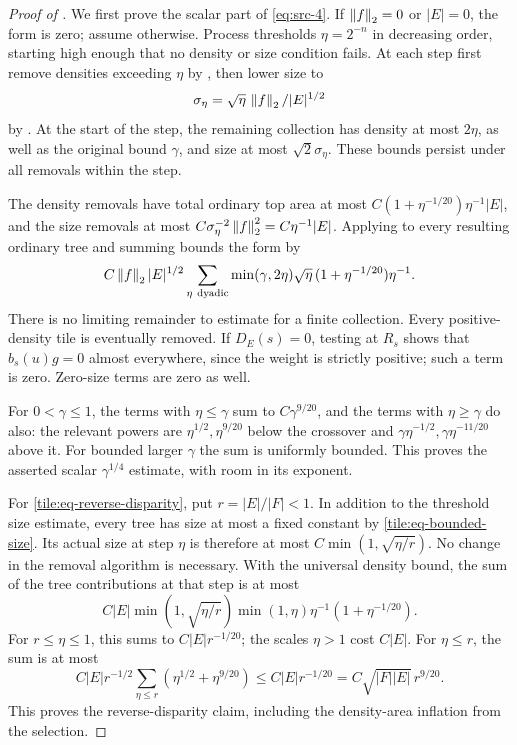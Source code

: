 \begin{proof}[Proof of ]
We first prove the scalar part of
\eqref{eq:src-4}.  If \(\left\|f\right\|_2=0\)
or \(|E|=0\), the form is zero; assume
otherwise.  Process thresholds
\(\eta=2^{-n}\) in decreasing order,
starting high enough that no density
or size condition fails.  At each
step first remove densities exceeding
\(\eta\) by ,
then lower size to
\[
 \sigma_\eta=\sqrt\eta\,
                    \left\|f\right\|_2/|E|^{1/2}
\]
by .  At the
start of the step, the remaining
collection has density at most
\(2\eta\), as well as the original
bound \(\gamma\), and size at most
\(\sqrt2\sigma_\eta\).  These
bounds persist under all removals
within the step.

The density removals have total
ordinary top area at most
\(C(1+\eta^{-1/20})\eta^{-1}|E|\),
and the size removals at most
\(C\sigma_\eta^{-2}\left\|f\right\|_2^2
 =C\eta^{-1}|E|\).
Applying  to
every resulting ordinary tree and
summing bounds the form by
\begin{equation}\label{tile:eq-threshold-sum}
 C\left\|f\right\|_2|E|^{1/2}
 \sum_{\eta\ \text{dyadic}}
       \min(\gamma,2\eta)\sqrt\eta\,
             (1+\eta^{-1/20})\eta^{-1}.
\end{equation}
There is no limiting remainder to
estimate for a finite collection.
Every positive-density tile is
eventually removed.  If \(D_E(s)=0\),
testing at \(R_s\) shows that
\(b_s(u)g=0\) almost everywhere,
since the weight is strictly positive;
such a term is zero.  Zero-size
terms are zero as well.

For \(0<\gamma\leq1\), the terms
with \(\eta\leq\gamma\) sum to
\(C\gamma^{9/20}\), and the terms
with \(\eta\geq\gamma\) do also:
the relevant powers are
\(\eta^{1/2},\eta^{9/20}\) below
the crossover and
\(\gamma\eta^{-1/2},
  \gamma\eta^{-11/20}\) above it.
For bounded larger \(\gamma\) the
sum is uniformly bounded.  This
proves the asserted scalar
\(\gamma^{1/4}\) estimate, with
room in its exponent.

For \eqref{tile:eq-reverse-disparity},
put \(r=|E|/|F|<1\).  In addition
to the threshold size estimate,
every tree has size at most a fixed
constant by \eqref{tile:eq-bounded-size}.
Its actual size at step \(\eta\)
is therefore at most
\(C\min(1,\sqrt{\eta/r})\).
No change in the removal algorithm
is necessary.  With the universal
density bound, the sum of the tree
contributions at that step is at most
\[
 C|E|\min(1,\sqrt{\eta/r})
              \min(1,\eta)\eta^{-1}
                    (1+\eta^{-1/20}).
\]
For \(r\leq\eta\leq1\), this sums
to \(C|E|r^{-1/20}\); the scales
\(\eta>1\) cost \(C|E|\).
For \(\eta\leq r\), the sum is at most
\[
 C|E|r^{-1/2}
          \sum_{\eta\leq r}
               (\eta^{1/2}+\eta^{9/20})
 \leq C|E|r^{-1/20}
 =C\sqrt{|F||E|}\,r^{9/20}.
\]
This proves the reverse-disparity
claim, including the density-area
inflation from the selection.


\end{proof}
